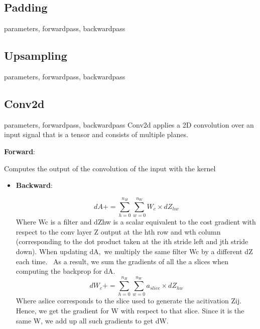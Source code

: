 \documentclass{article}
\begin{document}
\begin{multicols}{2}
\subsection{Padding}
parameters, forwardpass, backwardpass

\subsection{Upsampling}
parameters, forwardpass, backwardpass


\subsection{Conv2d}
parameters, forwardpass, backwardpass
Conv2d applies a 2D convolution over an input signal that is a tensor and consists of multiple planes.

\item \textbf{Forward}:

Computes the output of the convolution of the input with the kernel
\begin{itemize}
\begin{equation}
A_{o}^{(m)}=\sum_{k} W_{o k}^{(m)} * A_{k}^{(m-1)}+b_{o}^{(m)}
\end{equation}
With output shapes:


\begin{equation}

H_{\text {out }}=\left\lfloor\frac{H_{i n}+2 \times \text { padding }[0]-\text { dilation }[0] \times\text { (kernel_size-1) })}{\operatorname{stride}[0]}+1\right\rfloor

\end{equation}

\item \textbf{Backward}:

\begin{equation}
dA += \sum _{h=0} ^{n_H} \sum_{w=0} ^{n_W} W_c \times dZ_{hw} \tag{1}
\end{equation}
Where Wc is a filter and dZhw is a scalar equivalent to the cost gradient with respect to the conv layer Z output at the hth row and wth column (corresponding to the dot product taken at the ith stride left and jth stride down). When updating dA, we multiply the same filter Wc by a different dZ each time.  As a result, we sum the gradients of all the a slices when computing the backprop for dA.
\begin{equation}
dW_c  += \sum _{h=0} ^{n_H} \sum_{w=0} ^ {n_W} a_{slice} \times dZ_{hw}  \tag{2}
\end{equation}
Where  aslice corresponds to the slice used to generate the acitivation  Zij. Hence, we get the gradient for  W with respect to that slice. Since it is the same  W, we add up all such gradients to get  dW.



\end{itemize}
\end{multicols}
\end{document}
